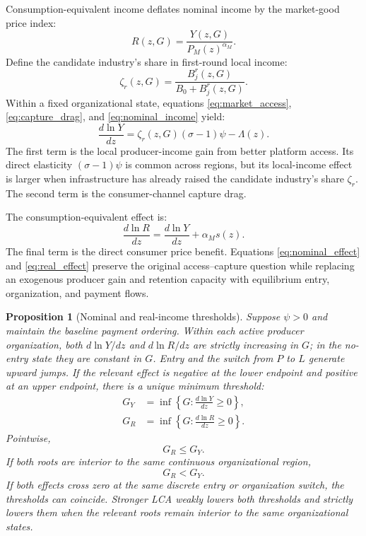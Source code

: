 \documentclass[11pt]{article}
\newtheorem{proposition}{Proposition}
\theoremstyle{definition}
\theoremstyle{remark}
\begin{document}
Consumption-equivalent income deflates nominal income by the market-good price
index:
\begin{equation}
 R(z,G)=\frac{Y(z,G)}{P_M(z)^{\alpha_M}}.
 \label{eq:real_income}
\end{equation}
Define the candidate industry's share in first-round local income:
\begin{equation}
 \zeta_r(z,G)=
 \frac{B_j^r(z,G)}
 {B_0+B_j^r(z,G)}.
 \label{eq:zeta}
\end{equation}
Within a fixed organizational state, equations
\eqref{eq:market_access}, \eqref{eq:capture_drag}, and
\eqref{eq:nominal_income} yield:
\begin{equation}
 \frac{d\ln Y}{dz}
 =
 \zeta_r(z,G)(\sigma-1)\psi
 -\Lambda(z).
 \label{eq:nominal_effect}
\end{equation}
The first term is the local producer-income gain from better platform access.
Its direct elasticity \((\sigma-1)\psi\) is common across regions, but its
local-income effect is larger when infrastructure has already raised the
candidate industry's share \(\zeta_r\).  The second term is the
consumer-channel capture drag.

The consumption-equivalent effect is:
\begin{equation}
 \frac{d\ln R}{dz}
 =
 \frac{d\ln Y}{dz}
 +\alpha_Ms(z).
 \label{eq:real_effect}
\end{equation}
The final term is the direct consumer price benefit.  Equations
\eqref{eq:nominal_effect} and \eqref{eq:real_effect} preserve the original
access--capture question while replacing an exogenous producer gain and
retention capacity with equilibrium entry, organization, and payment flows.

\begin{proposition}[Nominal and real-income thresholds]
\label{prop:income_thresholds}
Suppose \(\psi>0\) and maintain the baseline payment ordering.  Within
each active producer organization, both \(d\ln Y/dz\) and \(d\ln R/dz\) are
strictly increasing in \(G\); in the no-entry state they are constant in
\(G\).  Entry and the switch from \(P\) to \(L\) generate upward jumps.  If
the relevant effect is negative at the lower endpoint and positive at an
upper endpoint, there is a unique minimum threshold:
\begin{align}
 G_Y&=\inf\left\{G:\frac{d\ln Y}{dz}\geq0\right\},
 \label{eq:GY}\\
 G_R&=\inf\left\{G:\frac{d\ln R}{dz}\geq0\right\}.
 \label{eq:GR}
\end{align}
Pointwise,
\begin{equation}
 G_R\leq G_Y.
 \label{eq:weak_order}
\end{equation}
If both roots are interior to the same continuous organizational region,
\begin{equation}
 G_R<G_Y.
 \label{eq:strict_order}
\end{equation}
If both effects cross zero at the same discrete entry or organization switch,
the thresholds can coincide.  Stronger LCA weakly lowers both thresholds and
strictly lowers them when the relevant roots remain interior to the same
organizational states.
\end{proposition}
\end{document}
